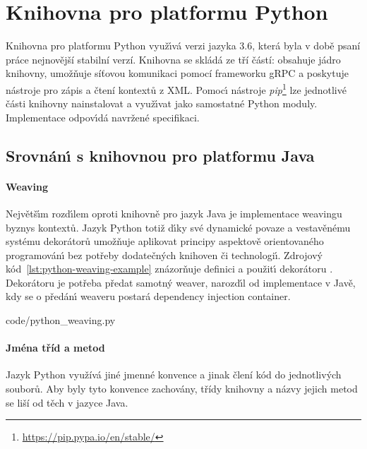 \section{Knihovna pro platformu Python}

Knihovna pro platformu Python využ\'{\i}vá verzi jazyka 3.6, která byla v době
psaní práce nejnovější stabilní verzí. Knihovna se skládá ze tří částí:  obsahuje jádro knihovny,
 umožňuje síťovou komunikaci pomocí frameworku
gRPC a  poskytuje nástroje pro zápis a čtení kontextů z \gls{XML}.
Pomoc\'{\i} nástroje \textit{pip}\footnote{\url{https://pip.pypa.io/en/stable/}}
lze jednotlivé části knihovny nainstalovat a využ\'{\i}vat jako samostatné
Python moduly. Implementace odpov\'{\i}dá navržené specifikaci.

\subsection{Srovnán\'{\i} s knihovnou pro platformu Java}

\paragraph{Weaving} Největš\'{\i}m rozd\'{\i}lem oproti knihovně pro
jazyk Java je implementace weavingu byznys kontextů.
Jazyk Python totiž d\'{\i}ky své dynamické povaze a vestavěnému
systému dekorátorů umožňuje aplikovat principy aspektově orientovaného
programován\'{\i} bez potřeby dodatečn\'ych knihoven či technologi\'{\i}.
Zdrojov\'y kód~\ref{lst:python-weaving-example} znázorňuje
definici a použit\'{\i} dekorátoru .
Dekorátoru je potřeba předat samotn\'y weaver, narozd\'{\i}l
od implementace v Javě, kdy se o předán\'{\i} weaveru postará dependency
injection container.


{code/python_weaving.py}

\paragraph{Jména tříd a metod} Jazyk Python využívá jiné jmenné konvence
a jinak člení kód do jednotlivých souborů. Aby byly tyto konvence zachovány,
třídy knihovny a názvy jejich metod se liší od těch v jazyce Java.

